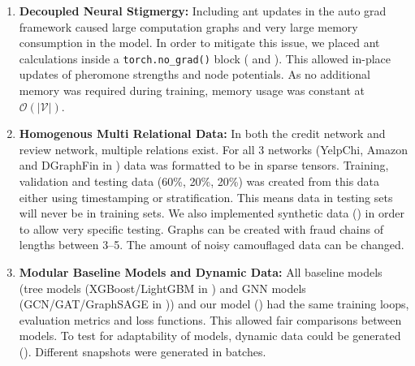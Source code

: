 \begin{enumerate}
    \item \textbf{Decoupled Neural Stigmergy:}
    Including ant updates in the auto grad framework caused large computation graphs and very large memory consumption in the model. In order to mitigate this issue, we placed ant calculations inside a \texttt{torch.no\_grad()} block ( and ). This allowed in-place updates of pheromone strengths and node potentials. As no additional memory was required during training, memory usage was constant at $\mathcal{O}(|\mathcal{V}|)$.
    
    \item \textbf{Homogenous Multi Relational Data:}
    In both the credit network and review network, multiple relations exist. For all 3 networks (YelpChi, Amazon and DGraphFin in ) data was formatted to be in sparse tensors. Training, validation and testing data (60\%, 20\%, 20\%) was created from this data either using timestamping or stratification. This means data in testing sets will never be in training sets. We also implemented synthetic data () in order to allow very specific testing. Graphs can be created with fraud chains of lengths between 3--5. The amount of noisy camouflaged data can be changed.

    \item \textbf{Modular Baseline Models and Dynamic Data:}
    All baseline models (tree models (XGBoost/LightGBM in ) and GNN models (GCN/GAT/GraphSAGE in )) and our model () had the same training loops, evaluation metrics and loss functions. This allowed fair comparisons between models. To test for adaptability of models, dynamic data could be generated (). Different snapshots were generated in batches.
\end{enumerate}

